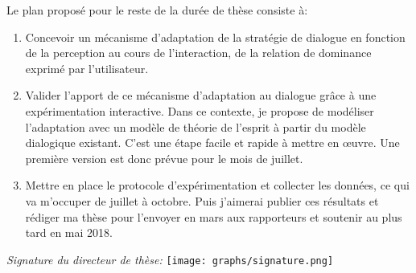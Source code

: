 \documentclass  [french] {article}
\begin{document}
	Le plan proposé pour le reste de la durée de thèse 	consiste à:
	
	\begin{enumerate}
		\item Concevoir un mécanisme d'adaptation de la stratégie de dialogue en fonction de la perception au cours de l'interaction, de la relation de dominance exprimé par l'utilisateur.
		\item Valider l'apport de ce mécanisme d'adaptation au dialogue grâce à une expérimentation interactive. Dans ce contexte, je propose de modéliser l'adaptation avec un modèle de théorie de l'esprit \cite{carlson2013theory} à partir du modèle dialogique existant. C'est une étape facile et rapide à mettre en œuvre. Une première version est donc prévue pour le mois de juillet.  
		\item Mettre en place le protocole d'expérimentation et collecter les données, ce qui va m'occuper de juillet à octobre. Puis j'aimerai publier ces résultats et rédiger ma thèse pour l'envoyer en mars aux rapporteurs et soutenir au plus tard en mai 2018.
	\end{enumerate}

	\noindent\emph{       Signature du directeur de thèse:} \texttt{[image: graphs/signature.png]}
%	
	
	  
	
		
		
		\scriptsize{	
			
			}

	
\end{document}
